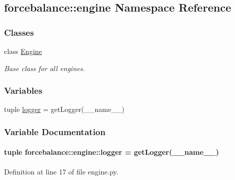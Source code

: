 \hypertarget{namespaceforcebalance_1_1engine}{\subsection{forcebalance\-:\-:engine \-Namespace \-Reference}
\label{namespaceforcebalance_1_1engine}
}
\subsubsection*{\-Classes}
\begin{DoxyCompactItemize}
\item 
class \hyperlink{classforcebalance_1_1engine_1_1Engine}{\-Engine}
\begin{DoxyCompactList}\small\item\em \-Base class for all engines. \end{DoxyCompactList}\end{DoxyCompactItemize}
\subsubsection*{\-Variables}
\begin{DoxyCompactItemize}
\item 
tuple \hyperlink{namespaceforcebalance_1_1engine_ae4a289a63d0f20258665d7c5208cf2a2}{logger} = get\-Logger(\-\_\-\-\_\-name\-\_\-\-\_\-)
\end{DoxyCompactItemize}


\subsubsection{\-Variable \-Documentation}
\hypertarget{namespaceforcebalance_1_1engine_ae4a289a63d0f20258665d7c5208cf2a2}{
\paragraph[{logger}]{\setlength{\rightskip}{0pt plus 5cm}tuple {\bf forcebalance\-::engine\-::logger} = get\-Logger(\-\_\-\-\_\-name\-\_\-\-\_\-)}}\label{namespaceforcebalance_1_1engine_ae4a289a63d0f20258665d7c5208cf2a2}


\-Definition at line 17 of file engine.\-py.

